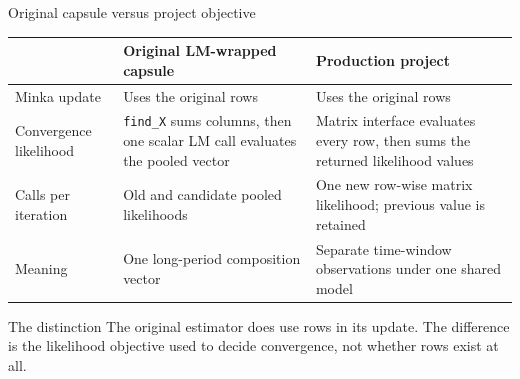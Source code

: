 \documentclass[aspectratio=169,10pt]{beamer}
\begin{document}
\begin{frame}{Original capsule versus project objective}
\small
\begin{tabular}{>{\raggedright\arraybackslash}p{}
                >{\raggedright\arraybackslash}p{}
                >{\raggedright\arraybackslash}p{}}
\toprule
& Original LM-wrapped capsule & Production project \\
\midrule
Minka update & Uses the original rows & Uses the original rows \\
\addlinespace
Convergence likelihood & \texttt{find\_X} sums columns, then one scalar LM
call evaluates the pooled vector & Matrix interface evaluates every row, then
sums the returned likelihood values \\
\addlinespace
Calls per iteration & Old and candidate pooled likelihoods & One new row-wise
matrix likelihood; previous value is retained \\
\addlinespace
Meaning & One long-period composition vector & Separate time-window
observations under one shared model \\
\bottomrule
\end{tabular}

\vspace{0.45cm}
\begin{alertblock}{The distinction}
The original estimator does use rows in its update. The difference is the
likelihood objective used to decide convergence, not whether rows exist at all.
\end{alertblock}
\end{frame}
\end{document}
